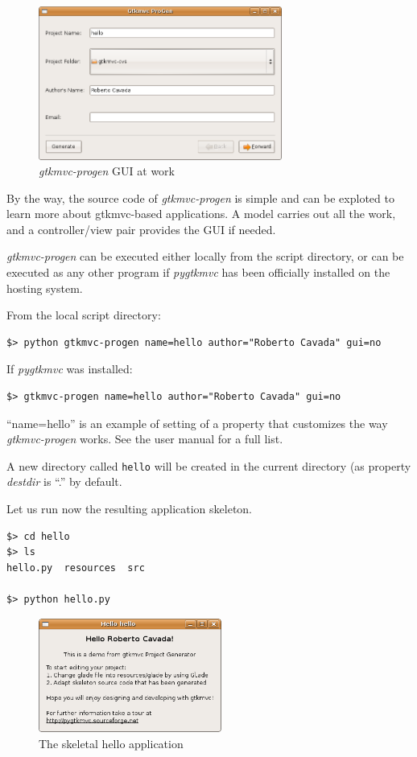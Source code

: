 \documentclass{article}
\newcommand{\kw}[1]{\emph{#1}\xspace}
\newcommand{\pygtkmvc}{\kw{pygtkmvc}}
\newcommand{\file}[1]{\texttt{#1}\xspace}
\begin{document}
\begin{figure}[htbp]
\begin{center}
\includegraphics[width=8cm]{eps/progen}
\caption{\label{fig:progen}\kw{gtkmvc-progen} GUI at work}
\end{center}
\end{figure}

By the way, the source code of \kw{gtkmvc-progen} is simple and can
be exploted to learn more about gtkmvc-based applications. A model
carries out all the work, and a controller/view pair provides the
GUI if needed.

\kw{gtkmvc-progen} can be executed either locally from the script
directory, or can be executed as any other program if \pygtkmvc has
been officially installed on the hosting system.

From the local script directory:
\begin{verbatim}
$> python gtkmvc-progen name=hello author="Roberto Cavada" gui=no
\end{verbatim}

If \pygtkmvc was installed:
\begin{verbatim}
$> gtkmvc-progen name=hello author="Roberto Cavada" gui=no
\end{verbatim}

``name=hello'' is an example of setting of a property that customizes the
way \kw{gtkmvc-progen} works. See the user manual for a full list. 

A new directory called \file{hello} will be created in the current
directory (as property \kw{destdir} is ``.'' by default. 

Let us run now the resulting application skeleton.

\begin{verbatim}
$> cd hello
$> ls
hello.py  resources  src

$> python hello.py
\end{verbatim}


\begin{figure}[htbp]
\begin{center}
\includegraphics[width=6cm]{eps/hello}
\caption{\label{fig:hello}The skeletal hello application}
\end{center}
\end{figure}
\end{document}
